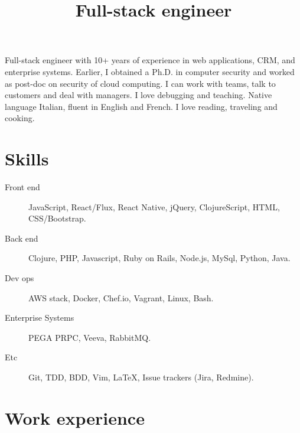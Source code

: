 \documentclass[a4paper,sans,10pt]{moderncv} %
\title{Full-stack engineer}
\newcommand{\experience}{Experience}
\newcommand{\skills}{Computer Skills}
\renewcommand{\experience}{Esperienze di lavoro}
\renewcommand{\skills}{Competenze informatiche}
\renewcommand{\experience}{Work experience}
\renewcommand{\skills}{Skills}
\begin{document}
\maketitle

	\vspace{-1.5em}  %
\justify
Full-stack engineer with 10+ years of experience in web applications, CRM, and enterprise systems.
Earlier, I obtained a Ph.D. in computer security and worked as post-doc on security of cloud computing.
I can work with teams, talk to customers and deal with managers. I love debugging and teaching.
Native language Italian, fluent in English and French. I love reading, traveling and cooking.

\section{\skills}
\begin{description}
\item [Front end] JavaScript, React/Flux, React Native, jQuery, ClojureScript, HTML, CSS/Bootstrap.
\item [Back end] Clojure, PHP, Javascript, Ruby on Rails, Node.js, MySql, Python, Java.
\item [Dev ops] AWS stack, Docker, Chef.io, Vagrant, Linux, Bash.
\item [Enterprise Systems] PEGA PRPC, Veeva, RabbitMQ.
\item [Etc] Git, TDD, BDD, Vim, \LaTeX, Issue trackers (Jira, Redmine).
\end{description}

  \section{\experience}

\renewcommand{\labelitemi}{\tiny$\blacksquare$}
\end{document}

